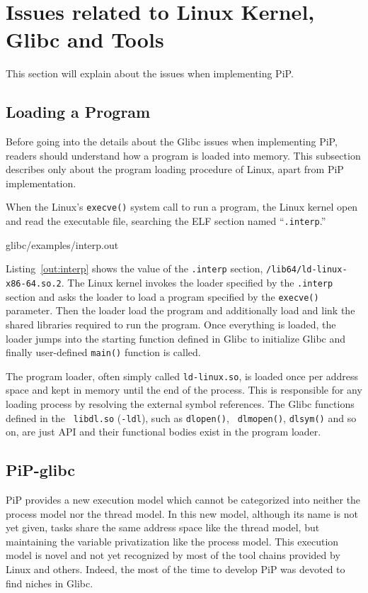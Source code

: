 
\section{Issues related to Linux Kernel, Glibc and Tools}

This section will explain about the issues when implementing PiP. 

\subsection{Loading a Program}

Before going into the details about the Glibc issues when implementing
PiP, readers should understand how a program is loaded into
memory. This subsection describes only about the program loading
procedure of Linux, apart from PiP implementation.

When the Linux's {\tt execve()} system call to run a program, the
Linux kernel open and read the executable file, searching the ELF
section named ``{\tt .interp}.''

 {glibc/examples/interp.out}

Listing~\ref{out:interp} shows the value of the {\tt .interp} section,
{\tt /lib64/ld-linux-x86-64.so.2}. The Linux kernel
invokes the loader specified by the {\tt .interp} section and asks the
loader to load a program specified by the {\tt execve()} parameter.
Then the loader load the program and additionally load and link the shared
libraries required to run the program. Once everything is loaded, the
loader jumps into the starting function defined in Glibc to initialize
Glibc and finally user-defined {\tt main()} function is called.

The program loader, often simply called {\tt ld-linux.so}, is loaded
once per address space and kept in memory until the end of the
process. This is responsible for any loading process by resolving the
external symbol references. The Glibc functions defined in the {\tt
  libdl.so} ({\tt -ldl}), such as {\tt   dlopen()}, {\tt
  dlmopen()}, {\tt dlsym()} and so on, are just API 
and their functional bodies exist in the program loader.

\subsection{PiP-glibc}

PiP provides a new execution model which cannot be categorized into
neither the process model nor the thread model. In this new model,
although its name is not yet given, tasks share the same address
space like the thread model, but maintaining the variable
privatization like the process model. This execution
model is novel and not yet recognized by most of the tool chains
provided by Linux and others. Indeed, the most of the time to develop
PiP was devoted to find niches in Glibc.

